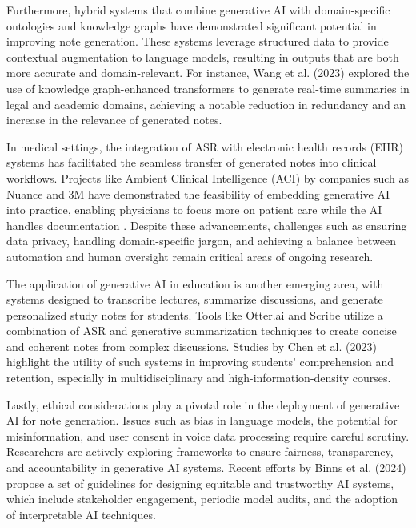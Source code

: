 \documentclass[12pt,a4paper]{article}
\begin{document}
Furthermore, hybrid systems that combine generative AI with domain-specific
ontologies and knowledge graphs have demonstrated significant potential in
improving note generation. These systems leverage structured data to provide
contextual augmentation to language models, resulting in outputs that are both
more accurate and domain-relevant. For instance, Wang et al. (2023)
\cite{wang2023ontology} explored the use of knowledge graph-enhanced
transformers to generate real-time summaries in legal and academic domains,
achieving a notable reduction in redundancy and an increase in the relevance of
generated notes.

In medical settings, the integration of ASR with electronic health records (EHR)
systems has facilitated the seamless transfer of generated notes into clinical
workflows. Projects like Ambient Clinical Intelligence (ACI) by companies such
as Nuance and 3M have demonstrated the feasibility of embedding generative AI
into practice, enabling physicians to focus more on patient care while the AI
handles documentation \cite{nuance2023aci}. Despite these advancements,
challenges such as ensuring data privacy, handling domain-specific jargon, and
achieving a balance between automation and human oversight remain critical areas
of ongoing research.

The application of generative AI in education is another emerging area, with
systems designed to transcribe lectures, summarize discussions, and generate
personalized study notes for students. Tools like Otter.ai and Scribe
\cite{otter2023scribe} utilize a combination of ASR and generative summarization
techniques to create concise and coherent notes from complex discussions.
Studies by Chen et al. (2023) \cite{chen2023education} highlight the utility of
such systems in improving students' comprehension and retention, especially in
multidisciplinary and high-information-density courses.

Lastly, ethical considerations play a pivotal role in the deployment of
generative AI for note generation. Issues such as bias in language models, the
potential for misinformation, and user consent in voice data processing require
careful scrutiny. Researchers are actively exploring frameworks to ensure
fairness, transparency, and accountability in generative AI systems. Recent
efforts by Binns et al. (2024) \cite{binns2024ethical} propose a set of
guidelines for designing equitable and trustworthy AI systems, which include
stakeholder engagement, periodic model audits, and the adoption of interpretable
AI techniques.
\end{document}
